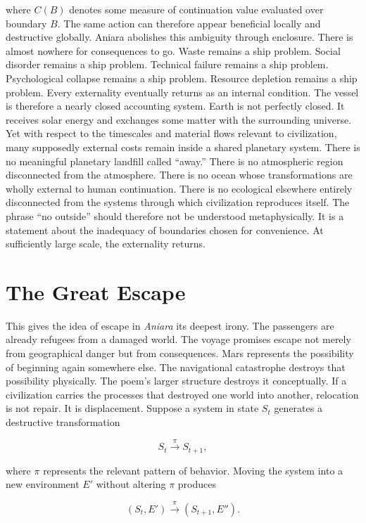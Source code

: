 \documentclass[11pt,oneside]{book}
\theoremstyle{definition}
\theoremstyle{remark}
\begin{document}
where \(C(B)\) denotes some measure of continuation value evaluated over boundary \(B\). The same
action can therefore appear beneficial locally and destructive globally. Aniara abolishes this
ambiguity through enclosure. There is almost nowhere for consequences to go. Waste remains a ship
problem. Social disorder remains a ship problem. Technical failure remains a ship problem.
Psychological collapse remains a ship problem. Resource depletion remains a ship problem. Every
externality eventually returns as an internal condition. The vessel is therefore a nearly closed
accounting system. Earth is not perfectly closed. It receives solar energy and exchanges some matter
with the surrounding universe. Yet with respect to the timescales and material flows relevant to
civilization, many supposedly external costs remain inside a shared planetary system. There is no
meaningful planetary landfill called ``away.'' There is no atmospheric region disconnected from the
atmosphere. There is no ocean whose transformations are wholly external to human continuation. There
is no ecological elsewhere entirely disconnected from the systems through which civilization
reproduces itself. The phrase ``no outside'' should therefore not be understood metaphysically. It
is a statement about the inadequacy of boundaries chosen for convenience. At sufficiently large
scale, the externality returns.

\section*{The Great Escape}

This gives the idea of escape in \emph{Aniara} its deepest irony. The passengers are already
refugees from a damaged world. The voyage promises escape not merely from geographical danger but
from consequences. Mars represents the possibility of beginning again somewhere else. The
navigational catastrophe destroys that possibility physically. The poem's larger structure destroys
it conceptually. If a civilization carries the processes that destroyed one world into another,
relocation is not repair. It is displacement. Suppose a system in state \(S_t\) generates a
destructive transformation

\[
S_t\xrightarrow{\pi}S_{t+1},
\]

where \(\pi\) represents the relevant pattern of behavior. Moving the system into a new environment
\(E'\) without altering \(\pi\) produces

\[
(S_t,E') \xrightarrow{\pi} (S_{t+1},E'').
\]
\end{document}
